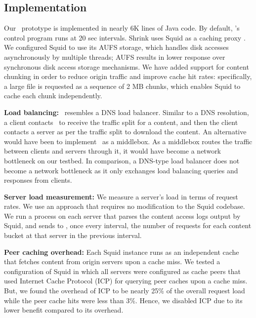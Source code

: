 



\subsection{Implementation}
\label{sec:implement}
Our \shrink\ prototype is implemented in nearly 6K lines of  Java code. By default, \shrink's control program runs at 20 sec intervals. Shrink uses Squid as a caching proxy \cite{squid}. We configured Squid to use its AUFS storage, which handles disk accesses asynchronously by multiple threads; AUFS results in lower response over synchronous disk access storage mechanisms. We have added  support for content chunking in order to reduce origin traffic and improve cache hit rates: specifically, a large file is requested as a sequence of 2 MB chunks, which enables Squid to cache each chunk independently.

\textbf{Load balancing:} \shrink\ resembles a DNS load balancer. Similar to a DNS resolution, a client contacts \shrink\ to receive the traffic split for a content, and then the client contacts a server as per the traffic split to download the content. 
An alternative would have been to implement \shrink\ as a middlebox. As a middlebox routes the traffic between clients and servers through it, it would have become a network bottleneck on our testbed. In comparison, a DNS-type load balancer does not become a network bottleneck as it only exchanges load balancing queries and responses from clients. 

\textbf{Server load measurement:} We measure a server's load in terms of request rates.  We use an approach that requires no modification to the Squid codebase. We run a process on each server that parses the content access logs output by Squid, and sends to \shrink, once every interval, the number of requests for each content bucket at that server in the previous interval.

\textbf{Peer caching overhead:} Each Squid instance runs as an independent cache that fetches content from origin servers upon a cache miss. We tested a configuration of Squid in which all servers were configured as cache peers that used Internet Cache Protocol (ICP) \cite{wessels1997rfc} for querying peer caches upon a cache miss. But, we found the overhead of  ICP to be nearly 25\% of the overall request load while the peer cache hits were less than 3\%. Hence, we disabled ICP due to its lower benefit compared to its overhead.

